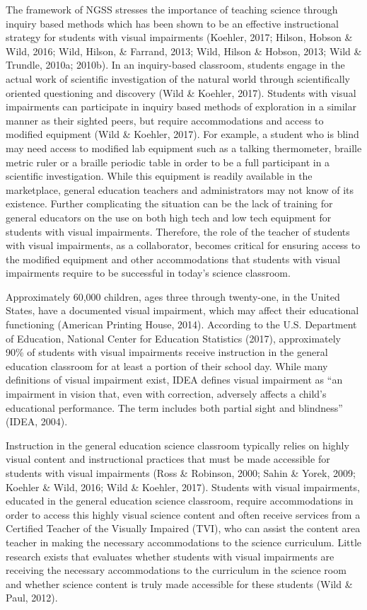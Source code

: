 \documentclass[11.5pt]{sig-alternate} %
\begin{document}
\begin{large}
The framework of NGSS stresses the importance of teaching science through inquiry based methods which has been shown to be an effective instructional strategy for students with visual impairments (Koehler, 2017; Hilson, Hobson \& Wild, 2016; Wild, Hilson, \& Farrand, 2013; Wild, Hilson \& Hobson, 2013; Wild \& Trundle, 2010a; 2010b).  In an inquiry-based classroom, students engage in the actual work of scientific investigation of the natural world through scientifically oriented questioning and discovery (Wild \& Koehler, 2017).  Students with visual impairments can participate in inquiry based methods of exploration in a similar manner as their sighted peers, but require accommodations and access to modified equipment (Wild \& Koehler, 2017). For example, a student who is blind may need access to modified lab equipment such as a talking thermometer, braille metric ruler or a braille periodic table in order to be a full participant in a scientific investigation. While this equipment is readily available in the marketplace, general education teachers and administrators may not know of its existence.  Further complicating the situation can be the lack of training for general educators on the use on both high tech and low tech equipment for students with visual impairments.  Therefore, the role of the teacher of students with visual impairments, as a collaborator, becomes critical for ensuring access to the modified equipment and other accommodations that students with visual impairments require to be successful in today’s science classroom.     

Approximately 60,000 children, ages three through twenty-one, in the United States, have a documented visual impairment, which may affect their educational functioning (American Printing House, 2014). According to the U.S. Department of Education, National Center for Education Statistics (2017), approximately 90\% of students with visual impairments receive instruction in the general education classroom for at least a portion of their school day.  While many definitions of visual impairment exist, IDEA defines visual impairment as “an impairment in vision that, even with correction, adversely affects a child’s educational performance.  The term includes both partial sight and blindness” (IDEA, 2004).  

Instruction in the general education science classroom typically relies on highly visual content and instructional practices that must be made accessible for students with visual impairments (Ross \& Robinson, 2000; Sahin \& Yorek, 2009; Koehler \& Wild, 2016; Wild \& Koehler, 2017).  Students with visual impairments, educated in the general education science classroom, require accommodations in order to access this highly visual science content and often receive services from a Certified Teacher of the Visually Impaired (TVI), who can assist the content area teacher in making the necessary accommodations to the science curriculum.  Little research exists that evaluates whether students with visual impairments are receiving the necessary accommodations to the curriculum in the science room and whether science content is truly made accessible for these students (Wild \& Paul, 2012).   


\end{large}
\end{document}
